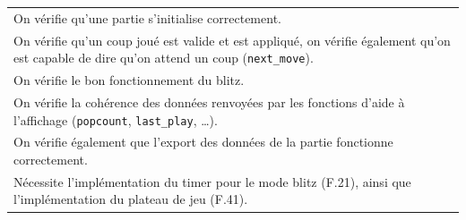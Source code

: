 \documentclass[a4paper,12pt]{article}
\begin{document}
\begin{tabularx}{\textwidth}{|X|}
    \arrayrulecolor{MediumAquamarine}\hline
    \arrayrulecolor{CornflowerBlue}
    On vérifie qu’une partie s’initialise correctement.                                                                                                                                                                     \\
    On vérifie qu’un coup joué est valide et est appliqué, on vérifie également qu’on est capable de dire qu’on attend un coup (\texttt{next\_move}).                                                                       \\
    On vérifie le bon fonctionnement du blitz.                                                                                                                                                                              \\
    On vérifie la cohérence des données renvoyées par les fonctions d’aide à l’affichage (\texttt{popcount}, \texttt{last\_play}, …).                                                                                       \\
    On vérifie également que l’export des données de la partie fonctionne correctement.                                                                                                                                     \\
    \arrayrulecolor{MediumAquamarine}\hline
    \arrayrulecolor{CornflowerBlue}
    Nécessite l'implémentation du timer pour le mode blitz (F.21), ainsi que l'implémentation du plateau de jeu (F.41).                                                                                                     \\
    \hline
\end{tabularx}

\vspace{1cm}
\end{document}
